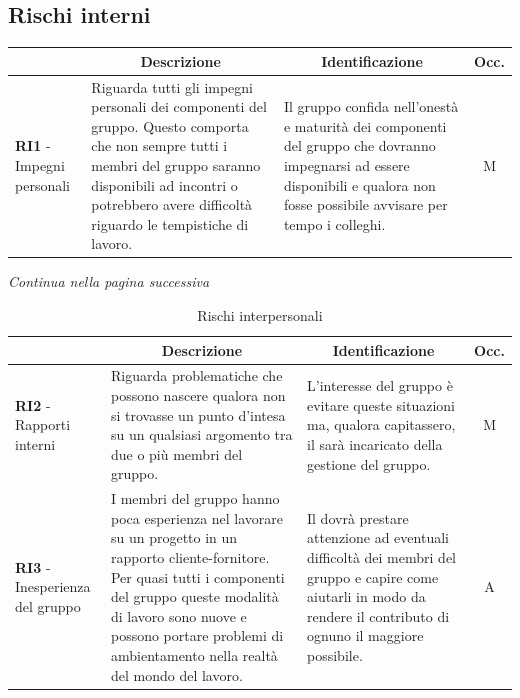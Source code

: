 \subsection{Rischi interni} \label{subsection:rischi_interni}
\begin{table}[H]
  \centering
  \renewcommand{\arraystretch}{1.8}
  \begin{tabular}{p{5.5cm}|p{5cm}|p{5cm}|c}
    \rowcolor[HTML]{125E28} 
    \multicolumn{1}{c}{\color[HTML]{FFFFFF}\textbf{Codice}}
    & \multicolumn{1}{c}{\color[HTML]{FFFFFF}\textbf{Descrizione}}
    & \multicolumn{1}{c}{\color[HTML]{FFFFFF}\textbf{Identificazione}}
    & \color[HTML]{FFFFFF}\textbf{Occ.}\\
    \hline
    \textbf{RI1} - Impegni personali & Riguarda tutti gli impegni personali dei componenti del gruppo. Questo comporta che non sempre tutti i membri del gruppo saranno disponibili ad incontri o potrebbero avere difficoltà riguardo le tempistiche di lavoro. & Il gruppo confida nell'onestà e maturità dei componenti del gruppo che dovranno impegnarsi ad essere disponibili e qualora non fosse possibile avvisare per tempo i colleghi. & M \\
  \end{tabular}
\end{table}
\begin{center}
  \textit{\small Continua nella pagina successiva}
\end{center}
\begin{table}[H]
  \centering
  \renewcommand{\arraystretch}{1.8}
  \begin{tabular}{p{5.5cm}|p{5cm}|p{5cm}|c}
    \rowcolor[HTML]{125E28} 
    \multicolumn{1}{c}{\color[HTML]{FFFFFF}\textbf{Codice}}
    & \multicolumn{1}{c}{\color[HTML]{FFFFFF}\textbf{Descrizione}}
    & \multicolumn{1}{c}{\color[HTML]{FFFFFF}\textbf{Identificazione}}
    & \color[HTML]{FFFFFF}\textbf{Occ.}\\
    \hline
    \textbf{RI2} - Rapporti interni & Riguarda problematiche che possono nascere qualora non si trovasse un punto d'intesa su un qualsiasi argomento tra due o più membri del gruppo. & L'interesse del gruppo è evitare queste situazioni ma, qualora capitassero, il \roleProjectManagerLow{} sarà incaricato della gestione del gruppo. & M \\
    \textbf{RI3} - Inesperienza del gruppo & I membri del gruppo hanno poca esperienza nel lavorare su un progetto in un rapporto cliente-fornitore. Per quasi tutti i componenti del gruppo queste modalità di lavoro sono nuove e possono portare problemi di ambientamento nella realtà del mondo del lavoro. & Il \roleProjectManagerLow{} dovrà prestare attenzione ad eventuali difficoltà dei membri del gruppo e capire come aiutarli in modo da rendere il contributo di ognuno il maggiore possibile. & A \\
  \end{tabular}
  \caption{Rischi interpersonali}
\end{table}

